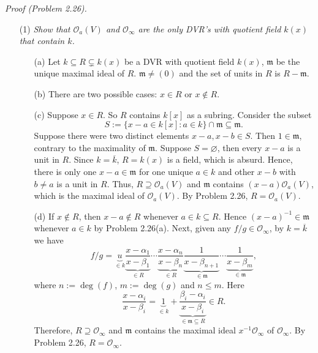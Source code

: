 \documentclass{article}
\begin{document}
\emph{Proof (Problem 2.26).}
\begin{enumerate}
\item[(1)]
  \emph{Show that $\mathscr{O}_{a}(V)$ and $\mathscr{O}_{\infty}$
  are the only DVR's with quotient field $k(x)$ that contain $k$.}
  \begin{enumerate}
  \item[(a)]
    Let $k \subseteq R \subsetneq k(x)$ be a DVR with quotient field $k(x)$,
    $\mathfrak{m}$ be the unique maximal ideal of $R$.
    $\mathfrak{m} \neq (0)$ and the set of units in $R$ is $R - \mathfrak{m}$.

  \item[(b)]
    There are two possible cases: $x \in R$ or $x \not\in R$.

  \item[(c)]
    Suppose $x \in R$. So $R$ contains $k[x]$ as a subring.
    Consider the subset
    \[
      S := \{ x - a \in k[x] : a \in k \} \cap \mathfrak{m}
      \subseteq \mathfrak{m}.
    \]
    Suppose there were two distinct elements $x - a, x - b \in S$.
    Then $1 \in \mathfrak{m}$, contrary to the maximality of $\mathfrak{m}$.
    Suppose $S = \varnothing$, then every $x - a$ is a unit in $R$.
    Since $k = \overline{k}$, $R = k(x)$ is a field, which is absurd.
    Hence, there is only one $x - a \in \mathfrak{m}$ for one unique $a \in k$
    and other $x - b$ with $b \neq a$ is a unit in $R$.
    Thus, $R \supseteq \mathscr{O}_{a}(V)$
    and $\mathfrak{m}$ contains $(x - a)\mathscr{O}_{a}(V)$,
    which is the maximal ideal of $\mathscr{O}_{a}(V)$.
    By Problem 2.26, $R = \mathscr{O}_{a}(V)$.

  \item[(d)]
    If $x \not\in R$, then $x - a \not\in R$ whenever $a \in k \subseteq R$.
    Hence $(x-a)^{-1} \in \mathfrak{m}$ whenever $a \in k$ by Problem 2.26(a).
    Next, given any $f/g \in \mathscr{O}_{\infty}$, by $k = \overline{k}$ we have
    \[
      f/g = \underbrace{u}_{\in k}
        \underbrace{\frac{x-\alpha_1}{x-\beta_1}}_{\in R} \cdots
        \underbrace{\frac{x-\alpha_n}{x-\beta_n}}_{\in R}
        \underbrace{\frac{1}{x-\beta_{n+1}}}_{\in \mathfrak{m}} \cdots
        \underbrace{\frac{1}{x-\beta_{m}}}_{\in \mathfrak{m}},
    \]
    where $n := \deg(f)$, $m := \deg(g)$ and $n \leq m$.
    Here
    \[
      \frac{x-\alpha_i}{x-\beta_i}
      = \underbrace{1}_{\in k}
        + \underbrace{\frac{\beta_i-\alpha_i}{x-\beta_i}}_{\in \mathfrak{m} \subseteq R} \in R.
    \]
    Therefore, $R \supseteq \mathscr{O}_{\infty}$ and $\mathfrak{m}$
    contains the maximal ideal $x^{-1} \mathscr{O}_{\infty}$ of $\mathscr{O}_{\infty}$.
    By Problem 2.26, $R = \mathscr{O}_{\infty}$.
  \end{enumerate}


\end{enumerate}
\end{document}
